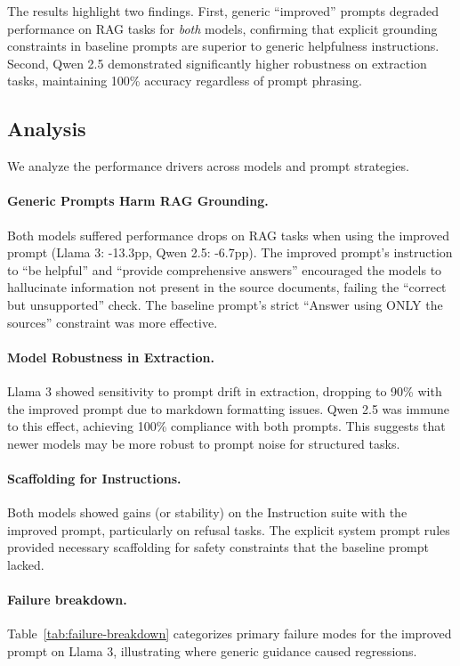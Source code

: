 The results highlight two findings. First, generic ``improved'' prompts degraded performance on RAG tasks for \emph{both} models, confirming that explicit grounding constraints in baseline prompts are superior to generic helpfulness instructions. Second, Qwen 2.5 demonstrated significantly higher robustness on extraction tasks, maintaining 100\% accuracy regardless of prompt phrasing.

\subsection{Analysis}

We analyze the performance drivers across models and prompt strategies.

\paragraph{Generic Prompts Harm RAG Grounding.} Both models suffered performance drops on RAG tasks when using the improved prompt (Llama 3: -13.3pp, Qwen 2.5: -6.7pp). The improved prompt's instruction to ``be helpful'' and ``provide comprehensive answers'' encouraged the models to hallucinate information not present in the source documents, failing the ``correct but unsupported'' check. The baseline prompt's strict ``Answer using ONLY the sources'' constraint was more effective.

\paragraph{Model Robustness in Extraction.} Llama 3 showed sensitivity to prompt drift in extraction, dropping to 90\% with the improved prompt due to markdown formatting issues. Qwen 2.5 was immune to this effect, achieving 100\% compliance with both prompts. This suggests that newer models may be more robust to prompt noise for structured tasks.

\paragraph{Scaffolding for Instructions.} Both models showed gains (or stability) on the Instruction suite with the improved prompt, particularly on refusal tasks. The explicit system prompt rules provided necessary scaffolding for safety constraints that the baseline prompt lacked.

\paragraph{Failure breakdown.} Table~\ref{tab:failure-breakdown} categorizes primary failure modes for the improved prompt on Llama 3, illustrating where generic guidance caused regressions.

